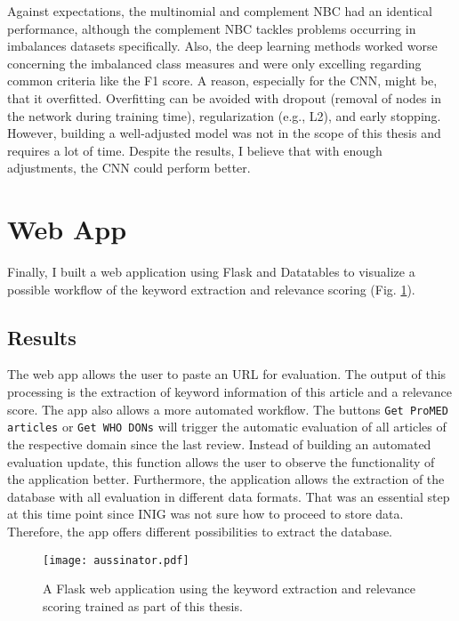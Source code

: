   Against expectations, the multinomial and complement NBC had an identical performance, although the complement NBC tackles problems occurring in imbalances datasets specifically.
  Also, the deep learning methods worked worse concerning the imbalanced class measures and were only excelling regarding common criteria like the F1 score.
  A reason, especially for the CNN, might be, that it overfitted.
  Overfitting can be avoided with dropout (removal of nodes in the network during training time), regularization (e.g., L2), and early stopping.
  However, building a well-adjusted model was not in the scope of this thesis and requires a lot of time.
  Despite the results, I believe that with enough adjustments, the CNN could perform better.

\section{Web App}
  Finally, I built a web application using Flask and Datatables to visualize a possible workflow of the keyword extraction and relevance scoring (Fig. \ref{fig:t-aussinator}).

\subsection{Results}
  The web app allows the user to paste an URL for evaluation.
  The output of this processing is the extraction of keyword information of this article and a relevance score.
  The app also allows a more automated workflow. The buttons \texttt{Get ProMED articles} or \texttt{Get WHO DONs} will trigger the automatic evaluation of all articles of the respective domain since the last review.
  Instead of building an automated evaluation update, this function allows the user to observe the functionality of the application better.
  Furthermore, the application allows the extraction of the database with all evaluation in different data formats.
  That was an essential step at this time point since INIG was not sure how to proceed to store data.
  Therefore, the app offers different possibilities to extract the database.

  \begin{figure}
    \centering
    \texttt{[image: aussinator.pdf]}
    \caption{A Flask web application using the keyword extraction and relevance scoring trained as part of this thesis.}
  \label{fig:t-aussinator}
  \end{figure}

